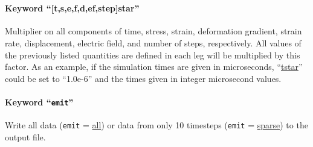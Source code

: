\documentclass[11pt]{article}
\newcommand{\levelo}{\indent\hspace{.2in}}
\newcommand{\levelt}{\indent\hspace{.4in}}
\newcommand{\levelth}{\indent\hspace{.6in}}
\newcommand{\emit}{\texttt{emit}}
\begin{document}
\levelo{}\\
\levelt{}\\
\levelt{}\\
\levelt{}\\
\levelt{}\\
\levelt{}\\
\levelt{}\\
\levelt{}\\
\levelt{}\\
\levelt{}\\
\levelt{}\\
\levelt{}\\
\levelt{}\\
\levelt{}\\
\levelt{}\\
\levelth{}\\
\levelt{}\\
\levelo{}\\

\paragraph{Keyword ``[t,s,e,f,d,ef,step]star''}
Multiplier on all components of time, stress, strain, deformation gradient,
strain rate, displacement, electric field, and number of steps, respectively. All
values of the previously listed quantities are defined in each leg will be
multiplied by this factor. As an example, if the simulation times are given in
microseconds, ``\url{tstar}'' could be set to ``1.0e-6'' and the times given in
integer microsecond values.

\paragraph{Keyword ``\emit{}''}
Write all data (\emit{} = \url{all}) or data from only 10 timesteps (\emit{} =
\url{sparse}) to the output file.

\end{document}
